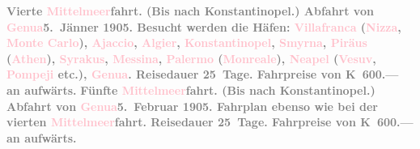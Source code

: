 \documentclass[twoside=false,titlepage=false,open=any, parskip=never, fontsize=12pt, headings=small, chapterprefix=false, appendixprefix=false]{scrbook}
\begin{document}
           \textcolor{gray}{\textbf{\textbf{Vierte \textcolor{pink}{Mittelmeer}{}\ledrightnote{\textcolor{pink}{Mittelmeer}}fahrt.}
                  (Bis nach Konstantinopel.) Abfahrt von \textcolor{pink}{Genua}{}\ledrightnote{\textcolor{pink}{Genua}}{ }\textbf{5. Jänner 1905}. Besucht werden die Häfen: \textcolor{pink}{Villafranca}{}\ledrightnote{\textcolor{pink}{Villefranche-sur-Mer}}
                     (\textcolor{pink}{Nizza}{}\ledrightnote{\textcolor{pink}{Nizza}}, \textcolor{pink}{Monte
                     Carlo}{}\ledrightnote{\textcolor{pink}{Monte Carlo}}), \textcolor{pink}{Ajaccio}{}\ledrightnote{\textcolor{pink}{Ajaccio}}, \textcolor{pink}{Algier}{}\ledrightnote{\textcolor{pink}{Algiers}}, \textcolor{pink}{Konstantinopel}{}\ledrightnote{\textcolor{pink}{Istanbul}}, \textcolor{pink}{Smyrna}{}\ledrightnote{\textcolor{pink}{Izmir}}, \textcolor{pink}{Piräus}{}\ledrightnote{\textcolor{pink}{Piraeus}} (\textcolor{pink}{Athen}{}\ledrightnote{\textcolor{pink}{Athen}}), \textcolor{pink}{Syrakus}{}\ledrightnote{\textcolor{pink}{Syrakus}}, \textcolor{pink}{Messina}{}\ledrightnote{\textcolor{pink}{Messina}}, \textcolor{pink}{Palermo}{}\ledrightnote{\textcolor{pink}{Palermo}} (\textcolor{pink}{Monreale}{}\ledrightnote{\textcolor{pink}{Monreale}}), \textcolor{pink}{Neapel}{}\ledrightnote{\textcolor{pink}{Neapel}} (\textcolor{pink}{Vesuv}{}\ledrightnote{\textcolor{pink}{Vesuv}}, \textcolor{pink}{Pompeji}{}\ledrightnote{\textcolor{pink}{Pompei}} etc.), \textcolor{pink}{Genua}{}\ledrightnote{\textcolor{pink}{Genua}}. Reisedauer 25 Tage. Fahrpreise von \textbf{K 600.—} an aufwärts.}}\pend
           \pstart
           \textcolor{gray}{\textbf{\textbf{Fünfte \textcolor{pink}{Mittelmeer}{}\ledrightnote{\textcolor{pink}{Mittelmeer}}fahrt.}
                  (Bis nach Konstantinopel.) Abfahrt von \textcolor{pink}{Genua}{}\ledrightnote{\textcolor{pink}{Genua}}{ }\textbf{5. Februar 1905}. Fahrplan ebenso wie bei der vierten \textcolor{pink}{Mittelmeer}{}\ledrightnote{\textcolor{pink}{Mittelmeer}}fahrt. Reisedauer 25 Tage. Fahrpreise von \textbf{K 600.—} an aufwärts.}}\pend
           \pstart
\end{document}
